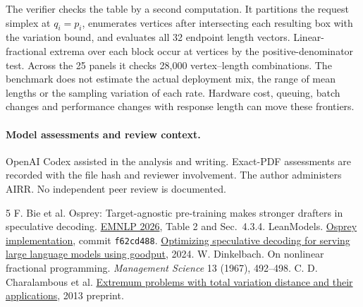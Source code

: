 \documentclass[11pt]{article}
\begin{document}
The verifier checks the table by a second computation. It partitions the request simplex at $q_i=p_i$, enumerates vertices after intersecting each resulting box with the variation bound, and evaluates all 32 endpoint length vectors. Linear-fractional extrema over each block occur at vertices by the positive-denominator test. Across the 25 panels it checks 28,000 vertex--length combinations. The benchmark does not estimate the actual deployment mix, the range of mean lengths or the sampling variation of each rate. Hardware cost, queuing, batch changes and performance changes with response length can move these frontiers.

\paragraph{Model assessments and review context.} OpenAI Codex assisted in the analysis and writing. Exact-PDF assessments are recorded with the file hash and reviewer involvement. The author administers AIRR. No independent peer review is documented.

\small\begin{thebibliography}{5}\setlength{\itemsep}{0pt}
 F. Bie et al. Osprey: Target-agnostic pre-training makes stronger drafters in speculative decoding. \href{https://aclanthology.org/2026.emnlp-main.1641/}{EMNLP 2026}, Table 2 and Sec.~4.3.4.
 LeanModels. \href{https://github.com/LeanModels/Osprey/tree/f62cd48844b03f3cb929543da25c15756e1f1095}{Osprey implementation}, commit \texttt{f62cd488}.
 \href{https://arxiv.org/abs/2406.14066}{Optimizing speculative decoding for serving large language models using goodput}, 2024.
 W. Dinkelbach. On nonlinear fractional programming. \emph{Management Science} 13 (1967), 492--498.
 C. D. Charalambous et al. \href{https://arxiv.org/abs/1301.4763}{Extremum problems with total variation distance and their applications}, 2013 preprint.
\end{thebibliography}
\end{document}
